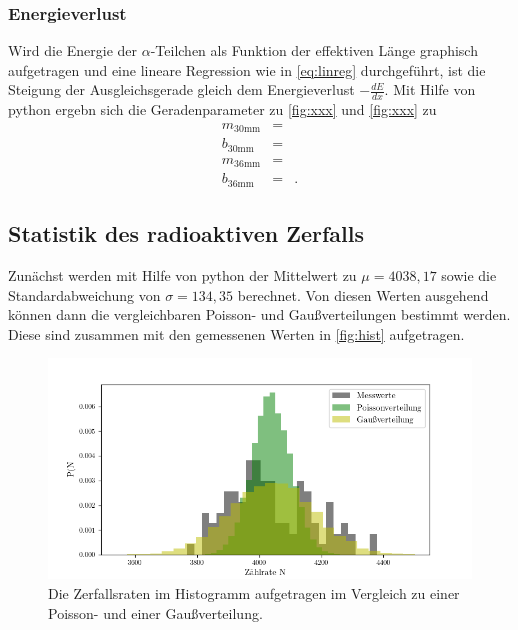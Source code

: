 \subsubsection*{Energieverlust}
Wird die Energie der $\alpha$-Teilchen als Funktion der effektiven Länge 
graphisch aufgetragen und eine lineare Regression wie in \autoref{eq:linreg} durchgeführt,
ist die Steigung der Ausgleichsgerade gleich dem Energieverlust $-\frac{dE}{dx}$.
Mit Hilfe von python ergebn sich die Geradenparameter zu \autoref{fig:xxx} und \autoref{fig:xxx}
zu
\begin{eqnarray}
  m_{\mathrm{30mm}} &=&   \nonumber  \\
  b_{\mathrm{30mm}} &=&   \nonumber  \\
  m_{\mathrm{36mm}} &=&   \nonumber  \\
  b_{\mathrm{36mm}} &=&  . \nonumber
\end{eqnarray}


\subsection{Statistik des radioaktiven Zerfalls}
Zunächst werden mit Hilfe von python \cite{numpy} der Mittelwert zu $\mu = 4038,17$ sowie die Standardabweichung von
$\sigma = 134,35$ berechnet. 
Von diesen Werten ausgehend können dann die vergleichbaren Poisson- und Gaußverteilungen 
bestimmt werden.\\
Diese sind zusammen mit den gemessenen Werten in \autoref{fig:hist} aufgetragen.

\begin{figure}
  \centering
  \includegraphics{content/histogramm.png}
  \caption{Die Zerfallsraten im Histogramm aufgetragen im Vergleich zu einer
  Poisson- und einer Gaußverteilung.}
  \label{fig:hist}
\end{figure}


